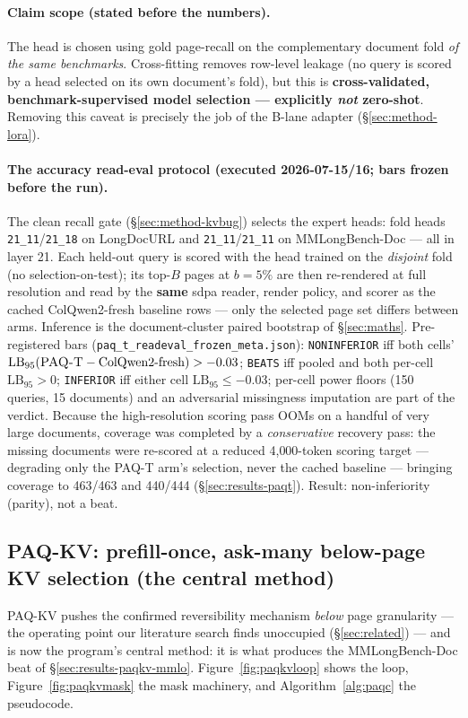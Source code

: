 \documentclass[11pt,letterpaper]{article}
\newcommand{\paqt}{\textsc{PAQ-T}}
\newcommand{\paqc}{\textsc{PAQ-KV}}
\newcommand{\lb}{\mathrm{LB}_{95}}
\begin{document}
\paragraph{Claim scope (stated before the numbers).} The head is chosen using gold page-recall on
the complementary document fold \emph{of the same benchmarks}. Cross-fitting removes row-level
leakage (no query is scored by a head selected on its own document's fold), but this is
\textbf{cross-validated, benchmark-supervised model selection --- explicitly \emph{not}
zero-shot}. Removing this caveat is precisely the job of the B-lane adapter
(\S\ref{sec:method-lora}).

\paragraph{The accuracy read-eval protocol (executed 2026-07-15/16; bars frozen before the run).}
The clean recall gate (\S\ref{sec:method-kvbug}) selects the expert heads: fold heads
\texttt{21\_11}/\texttt{21\_18} on LongDocURL and \texttt{21\_11}/\texttt{21\_11} on
MMLongBench-Doc --- all in layer 21. Each held-out query is scored with the head trained on the
\emph{disjoint} fold (no selection-on-test); its top-$B$ pages at $b=5\%$ are then re-rendered at
full resolution and read by the \textbf{same} sdpa reader, render policy, and scorer as the cached
ColQwen2-fresh baseline rows --- only the selected page set differs between arms. Inference is the
document-cluster paired bootstrap of \S\ref{sec:maths}. Pre-registered bars
(\texttt{paq\_t\_readeval\_frozen\_meta.json}): \texttt{NONINFERIOR} iff both cells'
$\lb(\text{\paqt{}}-\text{ColQwen2-fresh}) > -0.03$; \texttt{BEATS} iff pooled and both per-cell
$\lb > 0$; \texttt{INFERIOR} iff either cell $\lb \le -0.03$; per-cell power floors (150 queries,
15 documents) and an adversarial missingness imputation are part of the verdict. Because the
high-resolution scoring pass OOMs on a handful of very large documents, coverage was completed by
a \emph{conservative} recovery pass: the missing documents were re-scored at a reduced
4{,}000-token scoring target --- degrading only the \paqt{} arm's selection, never the cached
baseline --- bringing coverage to 463/463 and 440/444 (\S\ref{sec:results-paqt}). Result:
non-inferiority (parity), not a beat.

\subsection{\paqc{}: prefill-once, ask-many below-page KV selection (the central method)}\label{sec:method-paqc}
\paqc{} pushes the confirmed reversibility mechanism \emph{below} page granularity --- the
operating point our literature search finds unoccupied (\S\ref{sec:related}) --- and is now the
program's central method: it is what produces the MMLongBench-Doc beat of
\S\ref{sec:results-paqkv-mmlo}. Figure~\ref{fig:paqkvloop} shows the loop,
Figure~\ref{fig:paqkvmask} the mask machinery, and Algorithm~\ref{alg:paqc} the pseudocode.
\end{document}
